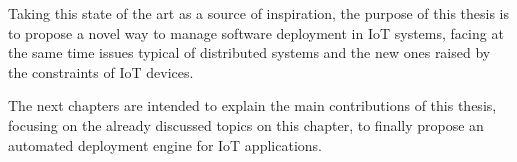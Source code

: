 Taking this state of the art as a source of inspiration, the purpose of this thesis is to propose a novel way to manage software deployment in IoT systems, facing at the same time issues typical of distributed systems and the new ones raised by the constraints of IoT devices.

The next chapters are intended to explain the main contributions of this thesis, focusing on the already discussed topics on this chapter, to finally propose an automated deployment engine for IoT applications.
